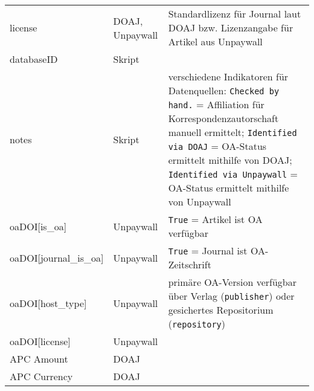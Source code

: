 \begin{appendices}
\begin{table}[h]
\begin{tabularx}{1\textwidth}{p{3cm}p{2.5cm}p{8cm}}
	license & DOAJ, Unpaywall & Standardlizenz für Journal laut DOAJ bzw. Lizenzangabe für Artikel aus Unpaywall \\
	databaseID & Skript & \\
	notes & Skript & verschiedene Indikatoren für Datenquellen: \newline \texttt{Checked by hand.} = Affiliation für Korrespondenzautorschaft manuell ermittelt; \newline \texttt{Identified via DOAJ} = OA-Status ermittelt mithilfe von DOAJ; \newline \texttt{Identified via Unpaywall} = OA-Status ermittelt mithilfe von Unpaywall\\
    oaDOI[is\_oa] & Unpaywall & \texttt{True} = Artikel ist OA verfügbar \\
    oaDOI[journal\_is\_oa] & Unpaywall & \texttt{True} = Journal ist OA-Zeitschrift \\
    oaDOI[host\_type] & Unpaywall & primäre OA-Version verfügbar über Verlag (\texttt{publisher}) oder gesichertes Repositorium (\texttt{repository})\\
    oaDOI[license] & Unpaywall & \\
    APC Amount & DOAJ & \\
    APC Currency & DOAJ & \\
	\bottomrule
    \end{tabularx}
\end{table}

\end{appendices}